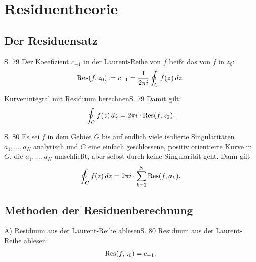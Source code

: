 \section{Residuentheorie}


\subsection{Der Residuensatz}

\begin{definition}[Residuum]{S. 79}
  \label{def:8_1}
  Der Koeefizient $c_{-1}$ in der Laurent-Reihe von $f$ heißt das  von $f$ in $z_0$:
  \begin{align}
    \operatorname{Res}(f, z_0) \coloneqq c_{-1} = \frac{1}{2 \pi i} \oint_C f(z)\, dz .
  \end{align}
\end{definition}

\begin{bemerkung}{Kurvenintegral mit Residuum berechnen}{S. 79}
  Damit gilt:
  \begin{align}
    \oint_C f(z)\, dz = 2 \pi i \cdot \operatorname{Res}(f, z_0) .
  \end{align}
\end{bemerkung}

\begin{satz}[Residuensatz]{S. 80}
  \label{satz:8_1}
  Es sei $f$ in dem Gebiet $G$ bis auf endlich viele isolierte Singularitäten $a_1, \dots, a_N$ analytisch und $C$ eine einfach geschlossene, positiv orientierte Kurve in $G$, die $a_1, \dots, a_N$ umschließt, aber selbst durch keine Singularität geht.
  Dann gilt
  \begin{align}
    \oint_C f(z)\, dz = 2 \pi i \cdot \sum_{k=1}^N \operatorname{Res}(f, a_k) .
  \end{align}
\end{satz}



\subsection{Methoden der Residuenberechnung}

\begin{bemerkung}{A) Residuum aus der Laurent-Reihe ablesen}{S. 80}
  Residuum aus der Laurent-Reihe ablesen:
  \begin{align}
    \operatorname{Res}(f, z_0) = c_{-1} .
  \end{align}
\end{bemerkung}

